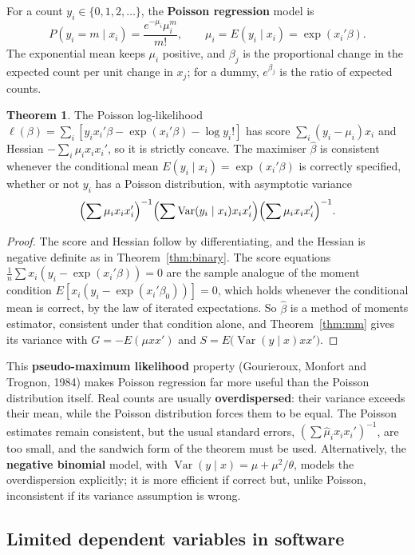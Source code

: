 \documentclass[11pt,a4paper]{article}
\numberwithin{equation}{section}
\DeclareMathOperator{\Var}{Var}
\theoremstyle{definition}
\newtheorem{thm}{Theorem}[subsection]
\begin{document}
For a count $y_i \in \{0, 1, 2, \dots\}$, the \textbf{Poisson regression} model is
\[
P(y_i = m \mid x_i) = \frac{e^{-\mu_i}\mu_i^m}{m!}, \qquad \mu_i = E(y_i \mid x_i) = \exp(x_i'\beta) .
\]
The exponential mean keeps $\mu_i$ positive, and $\beta_j$ is the proportional change in the expected count per unit change in $x_j$; for a dummy, $e^{\beta_j}$ is the ratio of
expected counts.

\begin{thm}
\label{thm:poisson}
The Poisson log-likelihood $\ell(\beta) = \sum_i[y_ix_i'\beta - \exp(x_i'\beta) - \log y_i!]$ has score $\sum_i(y_i - \mu_i)x_i$ and Hessian $-\sum_i\mu_ix_ix_i'$, so it is strictly concave. The
maximiser $\hat\beta$ is consistent whenever the conditional mean $E(y_i \mid x_i) = \exp(x_i'\beta)$ is correctly specified, whether or not $y_i$ has a Poisson distribution, with
asymptotic variance
\[
\Bigl(\sum\mu_ix_ix_i'\Bigr)^{-1}\Bigl(\sum\Var(y_i \mid x_i)x_ix_i'\Bigr)\Bigl(\sum\mu_ix_ix_i'\Bigr)^{-1} .
\]
\end{thm}

\begin{proof}
The score and Hessian follow by differentiating, and the Hessian is negative definite as in Theorem~\ref{thm:binary}. The score equations $\frac1n\sum x_i(y_i - \exp(x_i'\beta)) = 0$ are the
sample analogue of the moment condition $E[x_i(y_i - \exp(x_i'\beta_0))] = 0$, which holds whenever the conditional mean is correct, by the law of iterated expectations.
So $\hat\beta$ is a method of moments estimator, consistent under that condition alone, and Theorem~\ref{thm:mm} gives its variance with $G = -E(\mu xx')$ and $S = E\bigl(\Var(y \mid x)xx'\bigr)$.
\end{proof}

This \textbf{pseudo-maximum likelihood} property (Gourieroux, Monfort and Trognon, 1984) makes Poisson regression far more useful than the Poisson
distribution itself. Real counts are usually \textbf{overdispersed}: their variance exceeds their mean, while the Poisson distribution forces them to be equal.
The Poisson estimates remain consistent, but the usual standard errors, $(\sum\hat\mu_ix_ix_i')^{-1}$, are too small, and the sandwich form of the theorem must be used.
Alternatively, the \textbf{negative binomial} model, with $\Var(y \mid x) = \mu + \mu^2/\theta$, models the overdispersion explicitly; it is more efficient if correct but, unlike
Poisson, inconsistent if its variance assumption is wrong.

\subsection{Limited dependent variables in software}
\label{ssec:software17}
\end{document}
